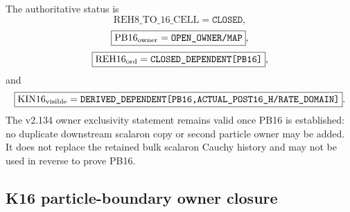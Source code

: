 \documentclass[12pt,a4paper]{article}
\begin{document}
\begin{remark}
\label{p8:rem:v2135-k16-status}
The authoritative status is
\[
 \boxed{\mathrm{REH8\_TO\_16\_CELL}=\texttt{CLOSED}},
\]
\[
 \boxed{\mathrm{PB16}_{\rm owner}=\texttt{OPEN\_OWNER/MAP}},
\]
\[
 \boxed{\mathrm{REH16}_{\rm ord}
 =\texttt{CLOSED\_DEPENDENT[PB16]}},
\]
and
\[
 \boxed{\mathrm{KIN16}_{\rm visible}
 =\texttt{DERIVED\_DEPENDENT[PB16,ACTUAL\_POST16\_H/RATE\_DOMAIN]}}.
\]
The v2.134 owner exclusivity statement remains valid once PB16 is established:
no duplicate downstream scalaron copy or second particle owner may be added.  It
does not replace the retained bulk scalaron Cauchy history and may not be used in
reverse to prove PB16.
\end{remark}

\subsection{K16 particle-boundary owner closure}
\label{p8:sec:v2136-pb16-owner-closure}
\end{document}
